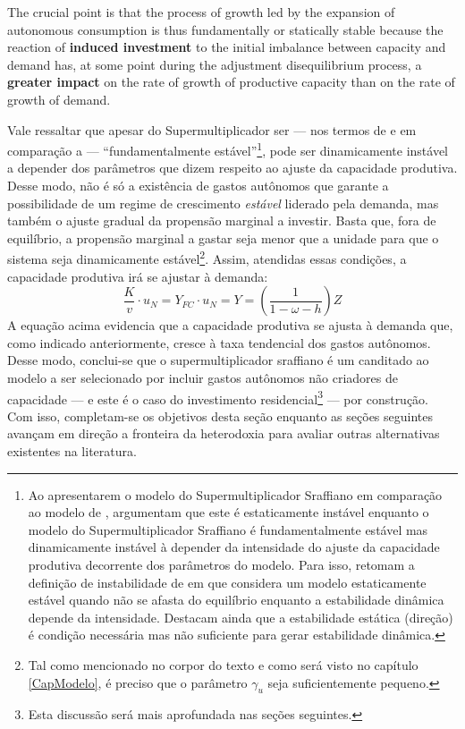 \begin{citacao}
The crucial point is that the process of growth led by the expansion of autonomous consumption is thus fundamentally or statically stable because the reaction of \textbf{induced investment} to the initial imbalance between capacity and demand has, at some point during the adjustment disequilibrium process, a \textbf{greater impact} on the rate of growth of productive capacity than on the rate of growth of demand. \cite[p.~19, grifos adicionados]{serrano_trouble_2017}
\end{citacao}

Vale ressaltar que apesar do Supermultiplicador ser --- nos termos de \textcite{hicks_capital_1965} e em comparação a \textcite{harrod_essay_1939} --- ``fundamentalmente estável''\footnote{
	Ao apresentarem o modelo do Supermultiplicador Sraffiano em comparação ao modelo de \textcite{harrod_essay_1939}, \textcite{serrano_trouble_2017} argumentam que este é estaticamente instável enquanto o modelo do Supermultiplicador Sraffiano é fundamentalmente estável mas dinamicamente instável à depender da intensidade do ajuste da capacidade produtiva decorrente dos parâmetros do modelo.
	Para isso, retomam a definição de instabilidade de \textcite{hicks_contribution_1972} em que considera um modelo estaticamente estável quando não se afasta do equilíbrio enquanto a estabilidade dinâmica depende da intensidade. Destacam ainda que a estabilidade estática (direção) é condição necessária mas não suficiente para gerar estabilidade dinâmica.
}, pode ser dinamicamente instável a depender dos parâmetros que dizem respeito ao ajuste da capacidade produtiva. Desse modo, não é só a existência de gastos autônomos que garante a possibilidade de um regime de crescimento \textit{estável} liderado pela demanda, mas também o ajuste gradual da propensão marginal a investir. Basta que, fora de equilíbrio, a propensão marginal a gastar seja menor que a unidade para que o sistema seja dinamicamente estável\footnote{Tal como mencionado no corpor do texto e como será visto no capítulo \ref{CapModelo}, é preciso que o parâmetro $\gamma_u$ seja suficientemente pequeno.}. Assim, atendidas essas condições, a capacidade produtiva irá se ajustar à demanda:
$$
 \frac{K}{v}\cdot u_N = Y_{FC}\cdot u_N = Y = \left(\frac{1}{1 - \omega - h}\right)Z
$$
A equação acima evidencia que a capacidade produtiva se ajusta à demanda que, como indicado anteriormente, cresce à taxa tendencial dos gastos autônomos. 
Desse modo, conclui-se que o supermultiplicador sraffiano é um canditado ao modelo a ser selecionado por incluir gastos autônomos não criadores de capacidade --- e este é o caso do investimento residencial\footnote{Esta discussão será mais aprofundada nas seções seguintes.} --- por construção.
Com isso, completam-se os objetivos desta seção enquanto as seções seguintes avançam em direção a fronteira da heterodoxia para avaliar outras alternativas existentes na literatura.

